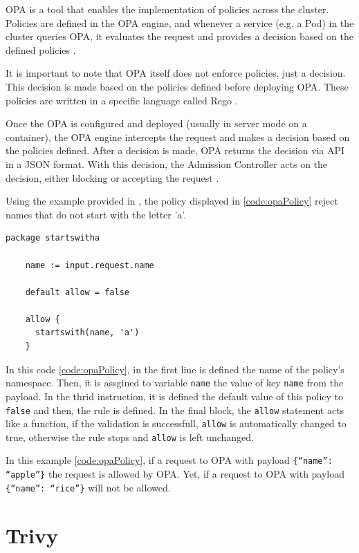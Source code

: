 \documentclass[a4paper,11pt,openright,BCOR=15mm]{scrbook}
\begin{document}
OPA is a tool that enables the implementation of policies across the cluster. Policies are defined in the OPA engine, and whenever a service (e.g. a Pod) in the cluster queries OPA, it evaluates the request and provides a decision based on the defined policies \cite{bruner_better_2020}.

It is important to note that OPA itself does not enforce policies, just a decision. This decision is made based on the policies defined before deploying OPA. These policies are written in a specific language called Rego \cite{barua_securing_2023}.

Once the OPA is configured and deployed (usually in server mode on a container), the OPA engine intercepts the request and makes a decision based on the policies defined. After a decision is made, OPA returns the decision via API in a JSON format. With this decision, the Admission Controller acts on the decision, either blocking or accepting the request \cite{opa_doc_guides_nodate}.

Using the example provided in \cite{bruner_better_2020}, the policy displayed in \ref{code:opaPolicy} reject names that do not start with the letter 'a'.

\begin{lstlisting}[style=yaml,caption={OPA policy example},label=code:opaPolicy]
	package startswitha
	
	name := input.request.name
	
	default allow = false
	
	allow {
	  startswith(name, 'a')
	}
\end{lstlisting}

In this code \ref{code:opaPolicy}, in the first line is defined the name of the policy's namespace. Then, it is assgined to variable \texttt{name} the value of key \texttt{name} from the payload. In the thrid instruction, it is defined the default value of this policy to \texttt{false} and then, the rule is defined. In the final block, the \texttt{allow} statement acts like a function, if the validation is successfull, \texttt{allow} is automatically changed to true, otherwise the rule stops and \texttt{allow} is left unchanged.

In this example \ref{code:opaPolicy}, if a request to OPA with payload \texttt{\{``name'': ``apple''\}} the request is allowed by OPA. Yet, if a request to OPA with payload \texttt{\{``name'': ``rice''\}} will not be allowed.


\section{Trivy}\label{sect:complementMonitor}
\end{document}

